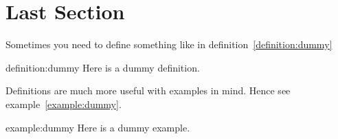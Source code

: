 \section{Last Section}

Sometimes you need to define something like in definition~\ref{definition:dummy}

\begin{bemerkung}[Dummy...]{definition:dummy}
Here is a dummy definition.
\end{bemerkung}


Definitions are much more useful with examples in mind.
Hence see example~\ref{example:dummy}.

\begin{example}[Dummy...]{example:dummy}
Here is a dummy example.
\end{example}


